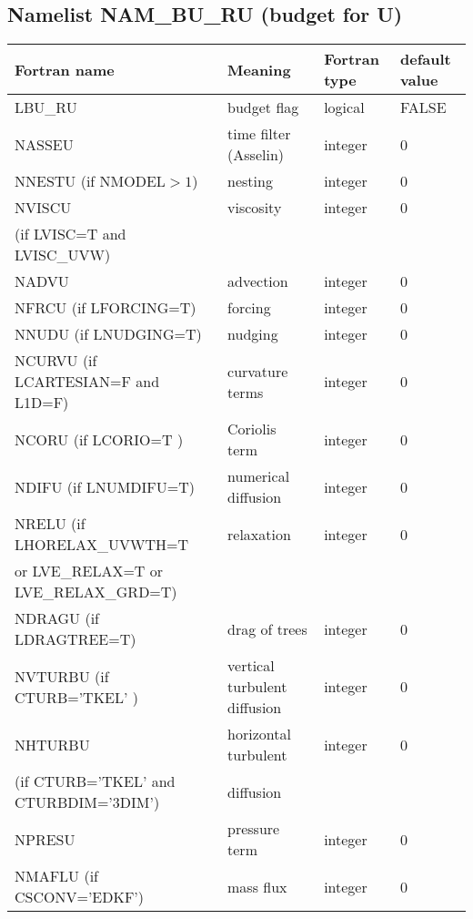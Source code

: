 \subsection{Namelist NAM\_BU\_RU (budget for U)}

\begin{longtable} {|p{}|p{}|>{\centering}p{}|p{}<{\centering}|}
\hline
Fortran name & Meaning & Fortran type & default value \\
\hline \hline
\endhead
LBU\_RU  & budget flag & logical & FALSE  \index{LBU\_RU!\innam{NAM\_BU\_RU}}\\\hline
NASSEU   & time filter (Asselin) & integer  &  0  \index{NASSEU!\innam{NAM\_BU\_RU}} \\\hline
NNESTU (if NMODEL$>1$)   & nesting           & integer  &  0 \index{NNESTU!\innam{NAM\_BU\_RU}} \\\hline
NVISCU   & viscosity         & integer  &  0 \index{NVISCU!\innam{NAM\_BU\_RU}}\\
(if LVISC=T and LVISC\_UVW) &  &   &   \\\hline
NADVU   & advection  & integer  &  0 \index{NADVU!\innam{NAM\_BU\_RU}} \\\hline
NFRCU (if LFORCING=T)   & forcing           & integer  &  0 \index{NFRCU!\innam{NAM\_BU\_RU}} \\\hline
NNUDU  (if LNUDGING=T)  & nudging           & integer  &  0 \index{NNUDU!\innam{NAM\_BU\_RU}} \\\hline
NCURVU (if LCARTESIAN=F and L1D=F) & curvature terms   & integer  &  0 \index{NCURVU!\innam{NAM\_BU\_RU}} \\\hline
NCORU (if LCORIO=T ) & Coriolis  term    & integer  &  0 \index{NCORU!\innam{NAM\_BU\_RU}}\\\hline
NDIFU (if LNUMDIFU=T) & numerical diffusion & integer  &  0 \index{NDIFU!\innam{NAM\_BU\_RU}} \\\hline
NRELU (if LHORELAX\_UVWTH=T & relaxation  & integer  &  0 \index{NRELU!\innam{NAM\_BU\_RU}} \\ \nopagebreak
 or LVE\_RELAX=T or LVE\_RELAX\_GRD=T) &  &   &   \\\hline
NDRAGU (if LDRAGTREE=T) & drag of trees & integer  &  0 \index{NDRAGU!\innam{NAM\_BU\_RU}} \\\hline
NVTURBU (if CTURB='TKEL' ) & vertical turbulent diffusion & integer  &  0 \index{NVTURBU!\innam{NAM\_BU\_RU}}\\\hline
NHTURBU & horizontal turbulent  & integer  &  0 \index{NHTURBU!\innam{NAM\_BU\_RU}}\\ \nopagebreak
(if CTURB='TKEL' and CTURBDIM='3DIM') &diffusion &   &  \\\hline
NPRESU   & pressure term       & integer  &  0    \index{NPRESU!\innam{NAM\_BU\_RU}} \\\hline
NMAFLU (if CSCONV='EDKF')  & mass flux        & integer  &  0 \index{NMAFLU!\innam{NAM\_BU\_RU}}\\\hline
\end{longtable}

